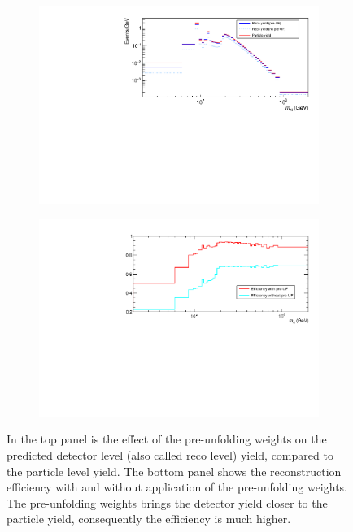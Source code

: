 \begin{figure}[htb!]
    \begin{subfigure}{.85\textwidth}\centering
        \includegraphics[width=.99\textwidth]{Figures/m4l/UnfoldingStudies/v014_preUF_compare.pdf}\caption{}
    \end{subfigure}
        \begin{subfigure}{.79\textwidth}\centering
        \includegraphics[width=.99\textwidth]{Figures/m4l/UnfoldingStudies/efficiency_preUF.pdf}\caption{}
    \end{subfigure}
    \caption{In the top panel is the effect of the pre-unfolding weights on the predicted detector level (also called reco level) yield, compared to the particle level yield. The bottom panel shows the reconstruction efficiency with and without application of the pre-unfolding weights. The pre-unfolding weights brings the detector yield closer to the particle yield, consequently the efficiency is much higher.}
    \label{fig:preUF}
\end{figure}

